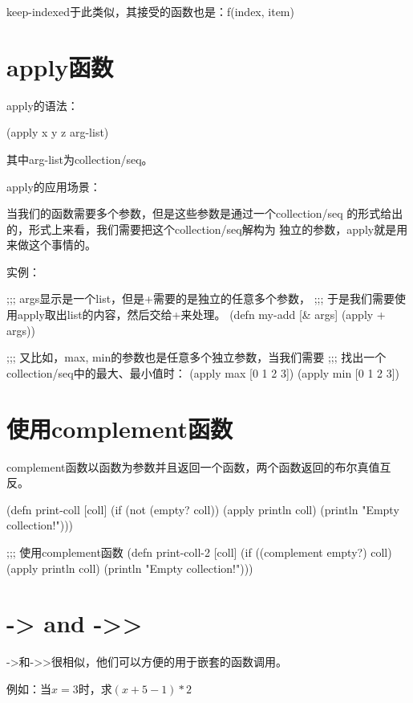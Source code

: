 \documentclass[a4paper,11pt]{article}
\begin{document}
  keep-indexed于此类似，其接受的函数也是：f(index, item)


  \section[function apply]{apply函数}
  apply的语法：

  \begin{schemecode}
    (apply x y z arg-list)
  \end{schemecode}

  其中arg-list为collection/seq。

  apply的应用场景：

  当我们的函数需要多个参数，但是这些参数是通过一个collection/seq
  的形式给出的，形式上来看，我们需要把这个collection/seq解构为
  独立的参数，apply就是用来做这个事情的。

  实例：

  \begin{schemecode}
    ;;; args显示是一个list，但是+需要的是独立的任意多个参数，
    ;;; 于是我们需要使用apply取出list的内容，然后交给+来处理。
    (defn my-add
      [& args]
      (apply + args))

    ;;; 又比如，max, min的参数也是任意多个独立参数，当我们需要
    ;;; 找出一个collection/seq中的最大、最小值时：
    (apply max [0 1 2 3])
    (apply min [0 1 2 3])
  \end{schemecode}


  \section[使用complement函数]{使用complement函数}
  complement函数以函数为参数并且返回一个函数，两个函数返回的布尔真值互反。
  
  \begin{schemecode}
(defn print-coll
  [coll]
  (if (not (empty? coll))
    (apply println coll)
    (println "Empty collection!")))

;;; 使用complement函数
(defn print-coll-2
  [coll]
  (if ((complement empty?) coll)
    (apply println coll)
    (println "Empty collection!")))
  \end{schemecode}


  \section[-> and ->>]{-> and ->>}
  ->和->>很相似，他们可以方便的用于嵌套的函数调用。

  例如：当$x=3$时，求$(x+5-1)*2$
\end{document}
